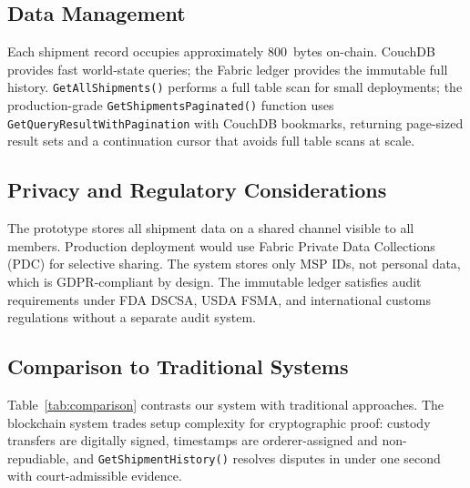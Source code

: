 \documentclass[conference]{IEEEtran}
\begin{document}
\subsection{Data Management}

Each shipment record occupies approximately 800~bytes on-chain.  CouchDB
provides fast world-state queries; the Fabric ledger provides the immutable
full history.  \texttt{GetAllShipments()} performs a full table scan for
small deployments; the production-grade \texttt{GetShipmentsPaginated()}
function uses \texttt{GetQueryResultWithPagination} with CouchDB bookmarks,
returning page-sized result sets and a continuation cursor that avoids
full table scans at scale.

\subsection{Privacy and Regulatory Considerations}

The prototype stores all shipment data on a shared channel visible to all
members.  Production deployment would use Fabric Private Data Collections
(PDC) for selective sharing.  The system stores only MSP IDs, not personal
data, which is GDPR-compliant by design.  The immutable ledger satisfies
audit requirements under FDA DSCSA, USDA FSMA, and international customs
regulations without a separate audit system.

\subsection{Comparison to Traditional Systems}

Table~\ref{tab:comparison} contrasts our system with traditional approaches.
The blockchain system trades setup complexity for cryptographic proof:
custody transfers are digitally signed, timestamps are orderer-assigned and
non-repudiable, and \texttt{GetShipmentHistory()} resolves disputes in under
one second with court-admissible evidence.
\end{document}
